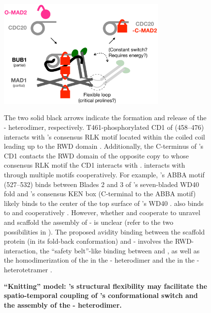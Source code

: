 \begin{figure}
    \centering
    \includegraphics[width=0.75\textwidth]{chapters/figures/KnittingModel.pdf}
    \caption{\textbf{``Knitting'' model: 's structural flexibility may facilitate the spatio-temporal coupling of 's conformational switch and the assembly of the - heterodimer.}}
    \noindent\justifying The two solid black arrows indicate the formation and release of the - heterodimer, respectively. T461-phosphorylated CD1 of  (458--476) interacts with 's consensus RLK motif located within the coiled coil leading up to the RWD domain \cite{Ji2017eLife, BUB1CD1-MAD1CStructure}. Additionally, the C-terminus of 's CD1 contacts the RWD domain of the opposite  copy to whose consensus RLK motif the CD1 interacts with \cite{BUB1CD1-MAD1CStructure}.  interacts with  through multiple motifs cooperatively. For example, 's ABBA motif (527--532) binds between Blades 2 and 3 of 's seven-bladed WD40 fold and 's consensus KEN box (C-terminal to the ABBA motif) likely binds to the center of the top surface of 's WD40 \cite{BUB1-CDC20-MAD1, CDC20-KEN, ABBA}.  also binds to  and  cooperatively \cite{BUB1-CDC20-MAD1, Tripartite}. However, whether  and  cooperate to unravel  and scaffold the assembly of - is unclear (refer to the two possibilities in ). The proposed avidity binding between the scaffold protein  (in its fold-back conformation) and - involves the RWD- interaction, the ``safety belt''-like binding between  and , as well as the homodimerization of the  in the - heterodimer and the  in the - heterotetramer \cite{TemplateModel, Structure1GO4, beta5-alphaCLoop, I-MAD2, Ji2017eLife, BUB1-CDC20-MAD1}.
    \label{KnittingModel}
\end{figure}

